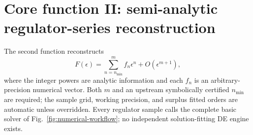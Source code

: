 \documentclass[11pt]{article}
\newcommand{\eps}{\epsilon}
\begin{document}
\section{Core function II: semi-analytic regulator-series reconstruction}
\label{sec:reconstruction-overview}

The second function reconstructs
\begin{equation}
 F(\eps)=\sum_{n=n_{\min}}^{m}f_n\eps^n+O(\eps^{m+1}),
\end{equation}
where the integer powers are analytic information and each $f_n$ is an arbitrary-precision
numerical vector.  Both $m$ and an upstream symbolically certified $n_{\min}$ are required;
the sample grid, working precision, and surplus fitted orders are automatic unless overridden. Every regulator
sample calls the complete basic solver of Fig.~\ref{fig:numerical-workflow}; no independent
solution-fitting DE engine exists.
\end{document}
